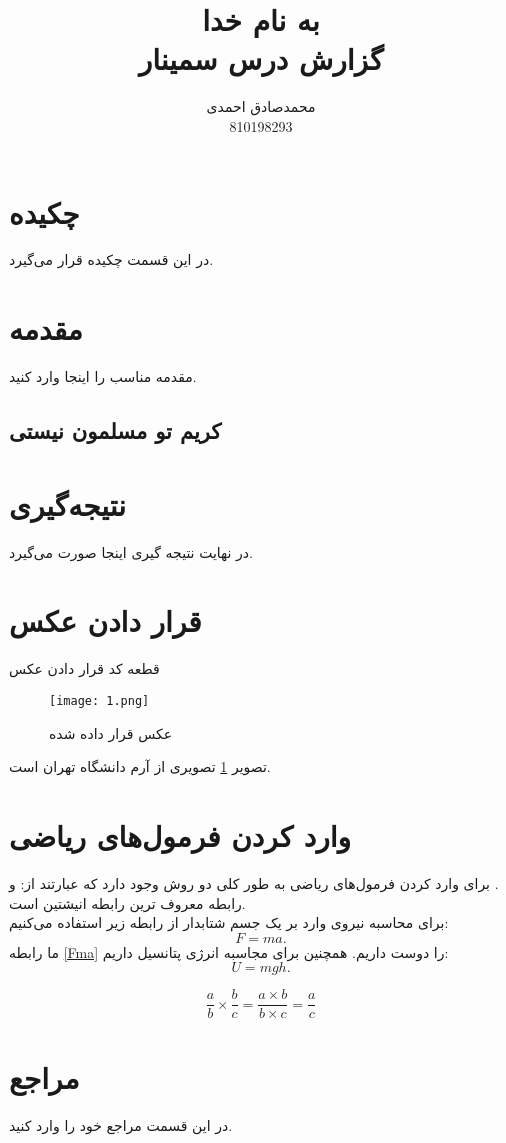 \documentclass[12pt,a4paper]{report}
\begin{document}
\title{به نام خدا \\ گزارش درس سمینار}
\author{محمدصادق احمدی \\ 810198293} 
\maketitle

\tableofcontents

\newpage

\section{چکیده}
در این قسمت چکیده قرار می‌گیرد.

\newpage

\section{مقدمه}
مقدمه مناسب را اینجا وارد کنید.
\newpage
\subsection{کریم تو مسلمون نیستی}
\newpage

\section{نتیجه‌گیری}
در نهایت نتیجه گیری اینجا صورت می‌گیرد.
\newpage

\section{قرار دادن عکس}
قطعه کد قرار دادن عکس
\begin{center}
	\begin{figure}[h]
	\centering
	\texttt{[image: 1.png]}
    \caption{عکس قرار داده شده}
    \label{a}
\end{figure}
\end{center}
تصویر \ref{a} تصویری از آرم دانشگاه تهران است. 
\newpage 

\section{وارد کردن فرمول‌های ریاضی }
برای وارد کردن فرمول‌های ریاضی به طور کلی دو روش وجود دارد که عبارتند از:  و  .
\\
رابطه  معروف ترین رابطه انیشتین است.
\\
برای محاسبه نیروی وارد بر یک جسم شتابدار از رابطه زیر استفاده می‌کنیم:
\begin{equation}
	\label{Fma}
	F=ma.
\end{equation}
ما رابطه \eqref{Fma} را دوست داریم.
همچنین برای مجاسبه انرژی پتانسیل داریم:
\begin{equation}
	U=mgh.
\end{equation}

\begin{equation}\label{MyEq}
  \frac{a}{b} \times \frac{b}{c} = \frac{a \times b}{b \times c} = \frac{a}{c}
\end{equation}


\newpage
\section{مراجع}
در این قسمت مراجع خود را وارد کنید.
\end{document}
